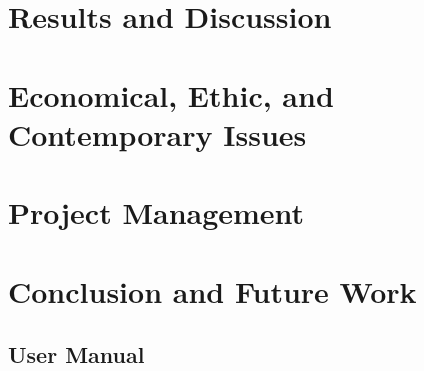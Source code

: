 \documentclass[12pt]{report}
\begin{document}
\chapter{Results and Discussion}

\chapter{Economical, Ethic, and Contemporary Issues}

\chapter{Project Management}

\chapter{Conclusion and Future Work}
\newpage



\newpage

\begin{appendices}

\chapter{User Manual}

\end{appendices}
\end{document}
